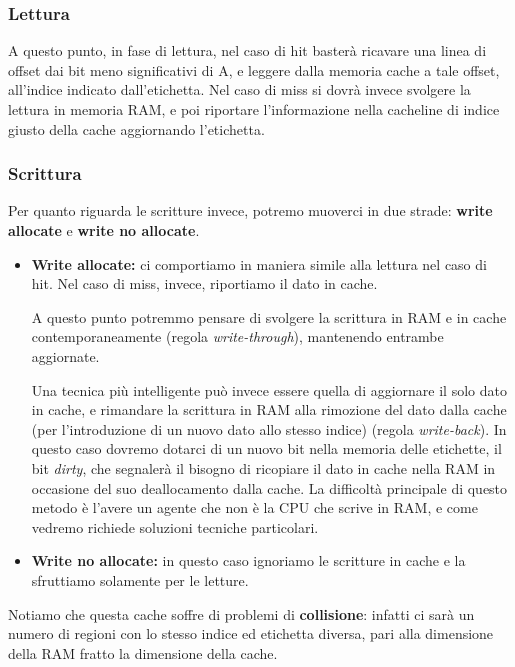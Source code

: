 \documentclass[a4paper,11pt]{article}
\begin{document}
\subsubsection{Lettura}
A questo punto, in fase di lettura, nel caso di hit basterà ricavare una linea di offset dai bit meno significativi di A, e leggere dalla memoria cache a tale offset, all'indice indicato dall'etichetta.
Nel caso di miss si dovrà invece svolgere la lettura in memoria RAM, e poi riportare l'informazione nella cacheline di indice giusto della cache aggiornando l'etichetta.

\subsubsection{Scrittura}
Per quanto riguarda le scritture invece, potremo muoverci in due strade: \textbf{write allocate} e \textbf{write no allocate}.

\begin{itemize}
	\item \textbf{Write allocate:}
ci comportiamo in maniera simile alla lettura nel caso di hit.
Nel caso di miss, invece, riportiamo il dato in cache.

A questo punto potremmo pensare di svolgere la scrittura in RAM e in cache contemporaneamente (regola \textit{write-through}), mantenendo entrambe aggiornate.

Una tecnica più intelligente può invece essere quella di aggiornare il solo dato in cache, e rimandare la scrittura in RAM alla rimozione del dato dalla cache (per l'introduzione di un nuovo dato allo stesso indice) (regola \textit{write-back}).
In questo caso dovremo dotarci di un nuovo bit nella memoria delle etichette, il bit \textit{dirty}, che segnalerà il bisogno di ricopiare il dato in cache nella RAM in occasione del suo deallocamento dalla cache.
La difficoltà principale di questo metodo è l'avere un agente che non è la CPU che scrive in RAM, e come vedremo richiede soluzioni tecniche particolari.

\item \textbf{Write no allocate:}
in questo caso ignoriamo le scritture in cache e la sfruttiamo solamente per le letture.

\end{itemize}

\par\smallskip

Notiamo che questa cache soffre di problemi di \textbf{collisione}: infatti ci sarà un numero di regioni con lo stesso indice ed etichetta diversa, pari alla dimensione della RAM fratto la dimensione della cache.
\end{document}
